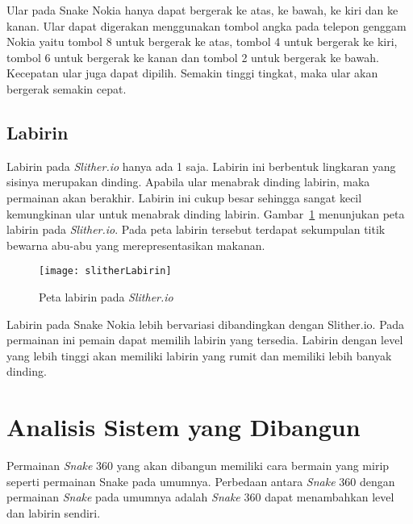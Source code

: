 Ular pada Snake Nokia hanya dapat bergerak ke atas, ke bawah, ke kiri dan ke kanan. Ular dapat digerakan menggunakan tombol angka pada telepon genggam Nokia yaitu tombol 8 untuk bergerak ke atas, tombol 4 untuk bergerak ke kiri, tombol 6 untuk bergerak ke kanan dan tombol 2 untuk bergerak ke bawah. Kecepatan ular juga dapat dipilih. Semakin tinggi tingkat, maka ular akan bergerak semakin cepat.

\subsection{Labirin}
Labirin pada \textit{Slither.io} hanya ada 1 saja. Labirin ini berbentuk lingkaran yang sisinya merupakan dinding. Apabila ular menabrak dinding labirin, maka permainan akan berakhir. Labirin ini cukup besar sehingga sangat kecil kemungkinan ular untuk menabrak dinding labirin. Gambar~\ref{fig:slitherLabirin} menunjukan peta labirin pada \textit{Slither.io}. Pada peta labirin tersebut terdapat sekumpulan titik bewarna abu-abu yang merepresentasikan makanan.

\begin{figure}[H]
	\centering  
	\texttt{[image: slitherLabirin]}  
	\caption[Peta labirin pada \textit{Slither.io}]{Peta labirin pada \textit{Slither.io}}
	\label{fig:slitherLabirin} 
\end{figure}

Labirin pada Snake Nokia lebih bervariasi dibandingkan dengan Slither.io. Pada permainan ini pemain dapat memilih labirin yang tersedia. Labirin dengan level yang lebih tinggi akan memiliki labirin yang rumit dan memiliki lebih banyak dinding. 

\section{Analisis Sistem yang Dibangun}
Permainan \textit{Snake} 360 yang akan dibangun memiliki cara bermain yang mirip seperti permainan Snake pada umumnya. Perbedaan antara \textit{Snake} 360 dengan permainan \textit{Snake} pada umumnya adalah \textit{Snake} 360 dapat menambahkan level dan labirin sendiri. 

